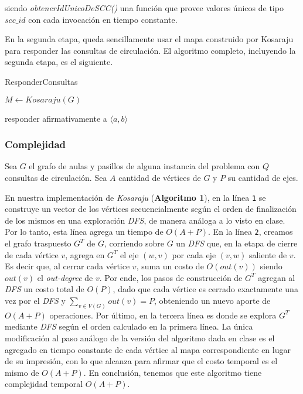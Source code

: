 \medskip

siendo \textit{obtenerIdUnicoDeSCC()} una función que provee valores únicos de tipo $scc\_id$ con cada invocación en tiempo constante.

\medskip

En la segunda etapa, queda sencillamente usar el mapa construido por Kosaraju para responder las consultas de circulación. El algoritmo completo, incluyendo la segunda etapa, es el siguiente.

\bigskip

\begin{algorithm}[H]
	\caption{ResponderConsultas}

    $M \gets \mathit{Kosaraju(G)}$ \;

     {
         {
            responder afirmativamente a $\langle a, b \rangle$
        } 
    }
\end{algorithm}

\subsubsection{Complejidad}

Sea $G$ el grafo de aulas y pasillos de alguna instancia del problema con $Q$ consultas de circulación. Sea $A$ cantidad de vértices de $G$ y $P$ su cantidad de ejes.

En nuestra implementación de \textit{Kosaraju} (\textbf{Algoritmo 1}), en la línea \texttt{1} se construye un vector de los vértices secuencialmente según el orden de finalización de los mismos en una exploración \textit{DFS}, de manera análoga a lo visto en clase. Por lo tanto, esta línea agrega un tiempo de $O(A+P)$. En la línea \texttt{2}, creamos el grafo traspuesto $G^T$ de $G$, corriendo sobre $G$ un \textit{DFS} que, en la etapa de cierre de cada vértice $v$, agrega en $G^T$ el eje $(w,v)$ por cada eje $(v,w)$ saliente de $v$. Es decir que, al cerrar cada vértice $v$, suma un costo de $O(out(v))$ siendo $out(v)$ el \textit{out-degree} de $v$. Por ende, los pasos de construcción de $G^T$ agregan al \textit{DFS} un costo total de $O(P)$, dado que cada vértice es cerrado exactamente una vez por el \textit{DFS} y $\sum\limits_{v \in V(G)} out(v) = P$, obteniendo un nuevo aporte de $O(A+P)$ operaciones. Por último, en la tercera línea es donde se explora $G^T$ mediante \textit{DFS} según el orden calculado en la primera línea. La única modificación al paso análogo de la versión del algoritmo dada en clase es el agregado en tiempo constante de cada vértice al mapa correspondiente en lugar de su impresión, con lo que alcanza para afirmar que el costo temporal es el mismo de $O(A+P)$. En conclusión, tenemos que este algoritmo tiene complejidad temporal $O(A+P)$.

